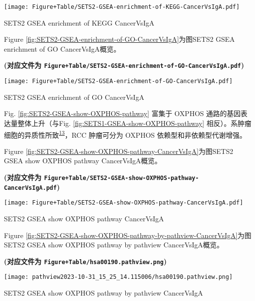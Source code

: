 \documentclass[
]{article}
\begin{document}
\def\@captype{figure}
\begin{center}
\texttt{[image: Figure+Table/SETS2-GSEA-enrichment-of-KEGG-CancerVsIgA.pdf]}
\caption{SETS2 GSEA enrichment of KEGG CancerVsIgA}\label{fig:SETS2-GSEA-enrichment-of-KEGG-CancerVsIgA}
\end{center}

Figure \ref{fig:SETS2-GSEA-enrichment-of-GO-CancerVsIgA}为图SETS2 GSEA enrichment of GO CancerVsIgA概览。

\textbf{(对应文件为 \texttt{Figure+Table/SETS2-GSEA-enrichment-of-GO-CancerVsIgA.pdf})}

\def\@captype{figure}
\begin{center}
\texttt{[image: Figure+Table/SETS2-GSEA-enrichment-of-GO-CancerVsIgA.pdf]}
\caption{SETS2 GSEA enrichment of GO CancerVsIgA}\label{fig:SETS2-GSEA-enrichment-of-GO-CancerVsIgA}
\end{center}

Fig. \ref{fig:SETS2-GSEA-show-OXPHOS-pathway} 富集于 OXPHOS 通路的基因表达量整体上升（与Fig. \ref{fig:SETS1-GSEA-show-OXPHOS-pathway} 相反）。系肿瘤细胞的异质性所致\textsuperscript{\protect\hyperlink{ref-HallmarksOfCaSancho2016}{13}}，RCC 肿瘤可分为 OXPHOS 依赖型和非依赖型代谢增强。

Figure \ref{fig:SETS2-GSEA-show-OXPHOS-pathway-CancerVsIgA}为图SETS2 GSEA show OXPHOS pathway CancerVsIgA概览。

\textbf{(对应文件为 \texttt{Figure+Table/SETS2-GSEA-show-OXPHOS-pathway-CancerVsIgA.pdf})}

\def\@captype{figure}
\begin{center}
\texttt{[image: Figure+Table/SETS2-GSEA-show-OXPHOS-pathway-CancerVsIgA.pdf]}
\caption{SETS2 GSEA show OXPHOS pathway CancerVsIgA}\label{fig:SETS2-GSEA-show-OXPHOS-pathway-CancerVsIgA}
\end{center}

Figure \ref{fig:SETS2-GSEA-show-OXPHOS-pathway-by-pathview-CancerVsIgA}为图SETS2 GSEA show OXPHOS pathway by pathview CancerVsIgA概览。

\textbf{(对应文件为 \texttt{Figure+Table/hsa00190.pathview.png})}

\def\@captype{figure}
\begin{center}
\texttt{[image: pathview2023-10-31\_15\_25\_14.115006/hsa00190.pathview.png]}
\caption{SETS2 GSEA show OXPHOS pathway by pathview CancerVsIgA}\label{fig:SETS2-GSEA-show-OXPHOS-pathway-by-pathview-CancerVsIgA}
\end{center}
\end{document}
